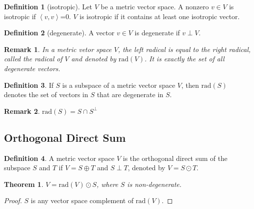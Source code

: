 \documentclass{book}
\newtheorem{theorem}{Theorem}[section]
\newtheorem*{remark}{Remark}
\theoremstyle{definition}
\newtheorem{definition}{Definition}[section]
\begin{document}
\begin{definition}[isotropic]
Let $V$ be a metric vector space. A nonzero $v\in V$ is isotropic if $\left\langle v,v \right\rangle$=0. $V$ is isotropic if it contains at least one isotropic vector. 
\end{definition}
\begin{definition}[degenerate]
A vector $v\in V$ is degenerate if $v\perp V$.
\end{definition}
\begin{remark}
In a metric vetor space $V$, the left radical is equal to the right radical, called the radical of $V$ and denoted by $\text{rad}(V)$. It is exactly the set of all degenerate vectors.
\end{remark}
\begin{definition}
If $S$ is a subspace of a metric vector space $V$, then $\text{rad}(S)$ denotes the set of vectors in $S$ that are degenerate in $S$.
\end{definition}
\begin{remark}
$\text{rad}(S)=S\cap S^\perp$
\end{remark}
\subsection{Orthogonal Direct Sum}
\begin{definition}
A metric vector space $V$ is the orthogonal direct sum of the subspace $S$ and $T$ if $V=S\oplus T$ and $S\perp T$, denoted by $V=S\odot T$.
\end{definition}

\begin{theorem}
$V=\text{rad}(V)\odot S$, where $S$ is non-degenerate.
\end{theorem}
\begin{proof}
$S$ is any vector space complement of $\text{rad}(V)$.
\end{proof}
\end{document}
